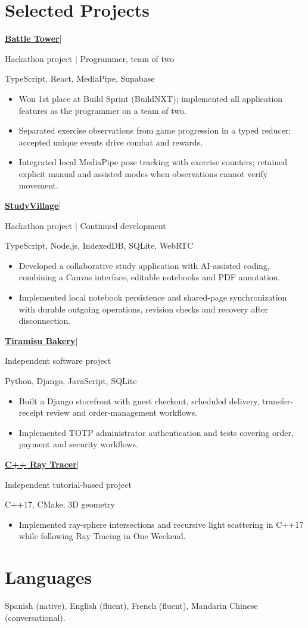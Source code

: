 \documentclass[11pt,a4paper]{article}
\newcommand{\entry}[2]{\textbf{#1}\enspace|\enspace{\small #2}\par}
\begin{document}
\section{Selected Projects}
\entry{\href{https://github.com/Javpato/real-life-battle-tower}{Battle Tower}}{Nov 2026}
{\small Hackathon project | Programmer, team of two}\par
{\small TypeScript, React, MediaPipe, Supabase}\par
\begin{itemize}
\item Won 1st place at Build Sprint (BuildNXT); implemented all application features as the programmer on a team of two.
\item Separated exercise observations from game progression in a typed reducer; accepted unique events drive combat and rewards.
\item Integrated local MediaPipe pose tracking with exercise counters; retained explicit manual and assisted modes when observations cannot verify movement.
\end{itemize}
\entry{\href{https://github.com/Javpato/studyvillage}{StudyVillage}}{2026 - Present}
{\small Hackathon project | Continued development}\par
{\small TypeScript, Node.js, IndexedDB, SQLite, WebRTC}\par
\begin{itemize}
\item Developed a collaborative study application with AI-assisted coding, combining a Canvas interface, editable notebooks and PDF annotation.
\item Implemented local notebook persistence and shared-page synchronization with durable outgoing operations, revision checks and recovery after disconnection.
\end{itemize}
\entry{\href{https://tiramisubakerygt.com}{Tiramisu Bakery}}{2026 - Present}
{\small Independent software project}\par
{\small Python, Django, JavaScript, SQLite}\par
\begin{itemize}
\item Built a Django storefront with guest checkout, scheduled delivery, transfer-receipt review and order-management workflows.
\item Implemented TOTP administrator authentication and tests covering order, payment and security workflows.
\end{itemize}
\entry{\href{https://github.com/Javpato/RayTracingProject}{C++ Ray Tracer}}{2025}
{\small Independent tutorial-based project}\par
{\small C++17, CMake, 3D geometry}\par
\begin{itemize}
\item Implemented ray-sphere intersections and recursive light scattering in C++17 while following Ray Tracing in One Weekend.
\end{itemize}
\section{Languages}
Spanish (native), English (fluent), French (fluent), Mandarin Chinese (conversational).
\end{document}
